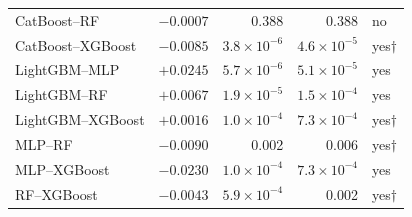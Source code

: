 {\begin{longtable}{@{}lrrrl@{}}
CatBoost--RF & $-0.0007$ & 0.388 & 0.388 & no \\
CatBoost--XGBoost & $-0.0085$ & $3.8\times10^{-6}$ & $4.6\times10^{-5}$ & yes$\dagger$ \\
LightGBM--MLP & $+0.0245$ & $5.7\times10^{-6}$ & $5.1\times10^{-5}$ & yes \\
LightGBM--RF & $+0.0067$ & $1.9\times10^{-5}$ & $1.5\times10^{-4}$ & yes \\
LightGBM--XGBoost & $+0.0016$ & $1.0\times10^{-4}$ & $7.3\times10^{-4}$ & yes$\dagger$ \\
MLP--RF & $-0.0090$ & 0.002 & 0.006 & yes$\dagger$ \\
MLP--XGBoost & $-0.0230$ & $1.0\times10^{-4}$ & $7.3\times10^{-4}$ & yes \\
RF--XGBoost & $-0.0043$ & $5.9\times10^{-4}$ & 0.002 & yes$\dagger$ \\
\bottomrule
\end{longtable}
}
